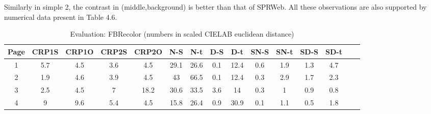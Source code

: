 Similarly in simple 2, the contrast in (middle,background) is better than that of SPRWeb. All these observations are also supported by numerical data present in Table 4.6.

\begin{table}[!htb]
\caption{Evaluation: FBRecolor (numbers in scaled CIELAB euclidean distance)}
\centering
\begin{tabular}{c c c c c c c c c c c c c c c}
\hline\hline
Page & CRP1S & CRP1O & CRP2S & CRP2O & N-S & N-t & D-S & D-t & SN-S & SN-t & SD-S & SD-t\\ [0.5ex]

\hline
1& 5.7 & 4.5 & 3.6 & 4.5 & 29.1 & 26.6 & 0.1 & 12.4 & 0.6 & 1.9 & 1.3 & 4.7\\
2& 1.9 & 4.6 & 3.9 & 4.5 & 43 & 66.5 & 0.1 & 12.4 & 0.3 & 2.9 & 1.7 & 2.3\\
3& 2.5 & 4.5 & 7 & 18.2 & 30.6 & 33.5 & 3.6 & 14 & 0.3 & 1 & 0.9 & 0.8\\
4& 9 & 9.6 & 5.4 & 4.5 & 15.8 & 26.4 & 0.9 & 30.9 & 0.1 & 1.1 & 0.5 & 1.8\\[1ex]

\hline
\end{tabular}
\label{table:nonlin}
\end{table}

